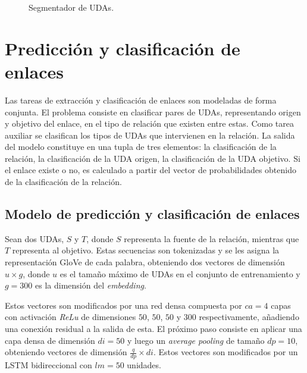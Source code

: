 \documentclass[a4paper,11pt,twocolumn,twoside]{article}
\begin{document}
\begin{figure}[h]
	\centering
	
	\caption{Segmentador de UDAs.}
	\label{fig:segmenter_model}
\end{figure}

\section{Predicción y clasificación de enlaces}

	
Las tareas de extracción y clasificación de enlaces son modeladas de forma conjunta.
El problema consiste en clasificar pares de UDAs, representando origen y objetivo del enlace, 
en el tipo de relación que existen entre estas.
Como tarea auxiliar se clasifican los tipos de UDAs que intervienen en la relación. La salida 
del modelo constituye en una tupla de tres elementos: la clasificación de la relación, 
la clasificación de la UDA origen, la clasificación de la UDA objetivo. Si el enlace
existe o no, es calculado a partir del vector de probabilidades obtenido de la clasificación de la relación.

\subsection{Modelo de predicción y clasificación de enlaces}\label{ssec:pred_clsf_enlaces}

Sean dos UDAs, $S$ y $T$, donde $S$ representa la fuente de la relación, mientras que $T$ representa
al objetivo. Estas secuencias son tokenizadas y se les asigna la representación GloVe de cada palabra, obteniendo
dos vectores de dimensión $u \times g$, donde $u$ es el tamaño máximo de UDAs en el conjunto de entrenamiento
y $g=300$ es la dimensión del \textit{embedding}.

Estos vectores son modificados por una red densa compuesta por $ca = 4$ capas con activación \textit{ReLu}
de dimensiones $50$, $50$, $50$ y $300$ respectivamente, añadiendo una conexión residual a la salida de esta. 
El próximo paso consiste en aplicar una capa densa de dimensión $di=50$ y luego un \textit{average pooling}
de tamaño $dp=10$, obteniendo vectores de dimensión $\frac{q}{dp} \times di$. 
Estos vectores son modificados por un LSTM bidireccional con $lm=50$ unidades. 
\end{document}
